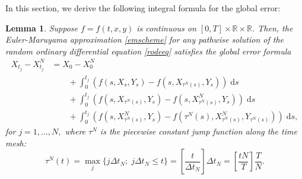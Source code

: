 \documentclass[reqno,12pt]{amsart}
\theoremstyle{plain}%
\newtheorem{lem}{Lemma}[section]
\theoremstyle{definition}
\begin{document}
In this section, we derive the following integral formula for the global error:
\begin{lem}
    Suppose $f=f(t, x, y)$ is continuous on $[0, T]\times \mathbb{R}\times \mathbb{R}$. Then, the Euler-Maruyama approximation \eqref{emscheme} for any pathwise solution of the random ordinary differential equation \eqref{rodeeq} satisfies the global error formula
    \begin{equation}
        \label{globalerrorintegralformula}
        \begin{aligned}
            X_{t_j} - X_{t_j}^N & = X_0 - X_0^N \\
            & \qquad + \int_0^{t_j} \left( f(s, X_s, Y_s) - f(s, X_{\tau^N(s)}, Y_s) \right)\;\mathrm{d}s  \\ 
            & \qquad + \int_{0}^{t_j} \left( f(s, X_{\tau^N(s)}, Y_s) - f(s, X_{\tau^N(s)}^N, Y_s) \right)\;\mathrm{d}s \\
            & \qquad + \int_0^{t_j} \left( f(s, X_{\tau^N(s)}^N, Y_s) - f(\tau^N(s), X_{\tau^N(s)}^N, Y_{\tau^N(s)}) \right)\;\mathrm{d}s,
        \end{aligned}
    \end{equation}
    for $j = 1, \ldots, N,$ where $\tau^N$ is the piecewise constant jump function along the time mesh:
    \begin{equation}
        \label{tauNt}
        \tau^N(t) = \max_j\{j\Delta t_N; \; j\Delta t_N \leq t\} = \left[\frac{t}{\Delta t_N}\right]\Delta t_N = \left[\frac{tN}{T}\right]\frac{T}{N}.
    \end{equation}
\end{lem}
\end{document}
